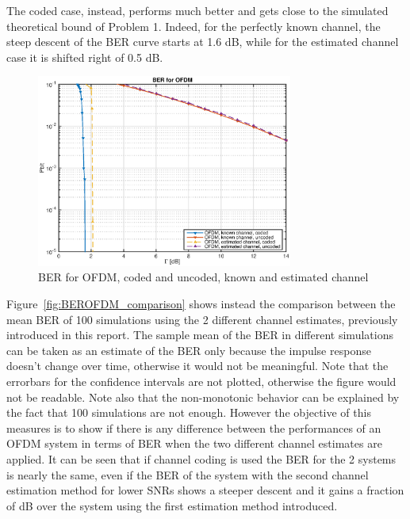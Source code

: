 \documentclass[10pt]{article}
\begin{document}
The coded case, instead, performs much better and gets close to the simulated theoretical bound of Problem 1. Indeed, for the perfectly known channel, the steep descent of the BER curve starts at 1.6 dB, while for the estimated channel case it is shifted right of 0.5 dB.
\begin{figure}[h!]
	\centering
	\includegraphics[width = 0.75\textwidth]{OFDM_BER_1}
	\caption{BER for OFDM, coded and uncoded, known and estimated channel}
	\label{fig:BEROFDM}
\end{figure}

Figure~\ref{fig:BEROFDM_comparison} shows instead the comparison between the mean BER of 100 simulations using the 2 different channel estimates, previously introduced in this report. The sample mean of the BER in different simulations can be taken as an estimate of the BER only because the impulse response doesn't change over time, otherwise it would not be meaningful. Note that the errorbars for the confidence intervals are not plotted, otherwise the figure would not be readable. Note also that the non-monotonic behavior can be explained by the fact that 100 simulations are not enough. However the objective of this measures is to show if there is any difference between the performances of an OFDM system in terms of BER when the two different channel estimates are applied. It can be seen that if channel coding is used the BER for the 2 systems is nearly the same, even if the BER of the system with the second channel estimation method for lower SNRs shows a steeper descent and it gains a fraction of dB over the system using the first estimation method introduced. 
\end{document}
